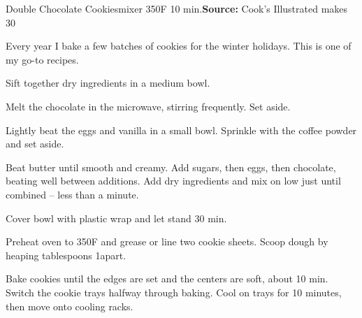 \begin{recipe}{Double Chocolate Cookies}{mixer \hfill 350\0F \hfill 10 min.}{\textbf{Source:} Cook's Illustrated \hfill makes 30}

 \freeform Every year I bake a few batches of cookies for the winter holidays. This is one of my go-to recipes.

 Sift together dry ingredients in a medium bowl.

 Melt the chocolate in the microwave, stirring frequently. Set aside.

 Lightly beat the eggs and vanilla in a small bowl. Sprinkle with the coffee powder and set aside.

 Beat butter until smooth and creamy. Add sugars, then eggs, then chocolate, beating well between additions. Add dry ingredients and mix on low just until combined -- less than a minute.

 \newstep Cover bowl with plastic wrap and let stand 30 min.

 \newstep Preheat oven to 350\0F and grease or line two cookie sheets. Scoop dough by heaping tablespoons 1\inch apart.

 \newstep Bake cookies until the edges are set and the centers are soft, about 10 min. Switch the cookie trays halfway through baking. Cool on trays for 10 minutes, then move onto cooling racks.

\end{recipe}


